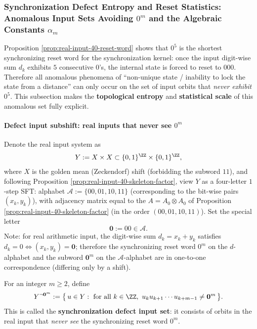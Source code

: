 \subsubsection{Synchronization Defect Entropy and Reset Statistics: Anomalous Input Sets Avoiding \texorpdfstring{$0^m$}{0m} and the Algebraic Constants \texorpdfstring{$\alpha_m$}{alpha m}}\label{app:real-input-40-defect-entropy}
Proposition \ref{prop:real-input-40-reset-word} shows that $0^5$ is the shortest synchronizing reset word for the synchronization kernel: once the input digit-wise sum $d_k$ exhibits $5$ consecutive $0$'s, the internal state is forced to reset to $000$.
Therefore all anomalous phenomena of ``non-unique state / inability to lock the state from a distance'' can only occur on the set of input orbits that \emph{never exhibit} $0^5$.
This subsection makes the \textbf{topological entropy} and \textbf{statistical scale} of this anomalous set fully explicit.

\paragraph{Defect input subshift: real inputs that never see \texorpdfstring{$0^m$}{0m}}
Denote the real input system as
\[
Y:=X\times X\subset\{0,1\}^{\ZZ}\times\{0,1\}^{\ZZ},
\]
where $X$ is the golden mean (Zeckendorf) shift (forbidding the subword $11$), and following Proposition \ref{prop:real-input-40-skeleton-factor}, view $Y$ as a four-letter $1$-step SFT:
alphabet
\(
\mathcal{A}:=\{00,01,10,11\}
\)
(corresponding to the bit-wise pairs $(x_k,y_k)$), with adjacency matrix equal to the
\(
A=A_0\otimes A_0
\)
of Proposition \ref{prop:real-input-40-skeleton-factor}
(in the order $(00,01,10,11)$).
Set the special letter
\[
\mathbf{0}:=00\in\mathcal{A}.
\]
Note: for real arithmetic input, the digit-wise sum $d_k=x_k+y_k$ satisfies
\(
d_k=0\iff (x_k,y_k)=\mathbf{0}
\);
therefore the synchronizing reset word $0^m$ on the $d$-alphabet and the subword $\mathbf{0}^m$ on the $\mathcal{A}$-alphabet are in one-to-one correspondence (differing only by a shift).

\begin{definition}\label{def:real-input-defect-subshift}
For an integer $m\ge 2$, define
\[
Y^{\neg \mathbf{0}^m}
:=\bigl\{\,u\in Y:\ \text{for all }k\in\ZZ,\ u_k u_{k+1}\cdots u_{k+m-1}\neq \mathbf{0}^m\,\bigr\}.
\]
This is called the \textbf{synchronization defect input set}: it consists of orbits in the real input that \emph{never see} the synchronizing reset word $0^m$.
\end{definition}

